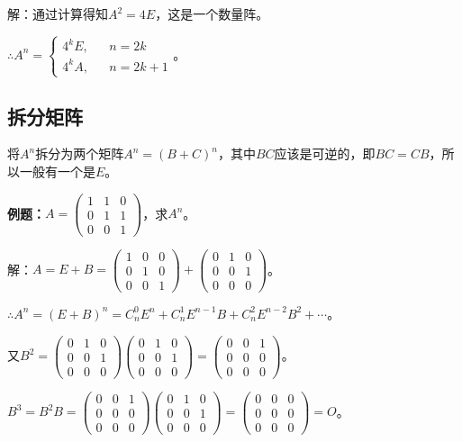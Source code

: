 \documentclass[UTF8, 12pt]{ctexart}
\begin{document}
解：通过计算得知$A^2=4E$，这是一个数量阵。\medskip

$\therefore A^n=\left\{\begin{array}{lcl}
    4^kE, & & n=2k \\
    4^kA, & & n=2k+1
\end{array}\right.$。

\subsection{拆分矩阵}

将$A^n$拆分为两个矩阵$A^n=(B+C)^n$，其中$BC$应该是可逆的，即$BC=CB$，所以一般有一个是$E$。\medskip

\textbf{例题：}$A=\left(\begin{array}{ccc}
    1 & 1 & 0 \\
    0 & 1 & 1 \\
    0 & 0 & 1
\end{array}\right)$，求$A^n$。\medskip

解：$A=E+B=\left(\begin{array}{ccc}
    1 & 0 & 0 \\
    0 & 1 & 0 \\
    0 & 0 & 1
\end{array}\right)+\left(\begin{array}{ccc}
    0 & 1 & 0 \\
    0 & 0 & 1 \\
    0 & 0 & 0
\end{array}\right)$。\medskip

$\therefore A^n=(E+B)^n=C_n^0E^n+C_n^1E^{n-1}B+C_n^2E^{n-2}B^2+\cdots$。

又$B^2=\left(\begin{array}{ccc}
    0 & 1 & 0 \\
    0 & 0 & 1 \\
    0 & 0 & 0
\end{array}\right)\left(\begin{array}{ccc}
    0 & 1 & 0 \\
    0 & 0 & 1 \\
    0 & 0 & 0
\end{array}\right)=\left(\begin{array}{ccc}
    0 & 0 & 1 \\
    0 & 0 & 0 \\
    0 & 0 & 0
\end{array}\right)$。

$B^3=B^2B=\left(\begin{array}{ccc}
    0 & 0 & 1 \\
    0 & 0 & 0 \\
    0 & 0 & 0
\end{array}\right)\left(\begin{array}{ccc}
    0 & 1 & 0 \\
    0 & 0 & 1 \\
    0 & 0 & 0
\end{array}\right)=\left(\begin{array}{ccc}
    0 & 0 & 0 \\
    0 & 0 & 0 \\
    0 & 0 & 0
\end{array}\right)=O$。
\end{document}
